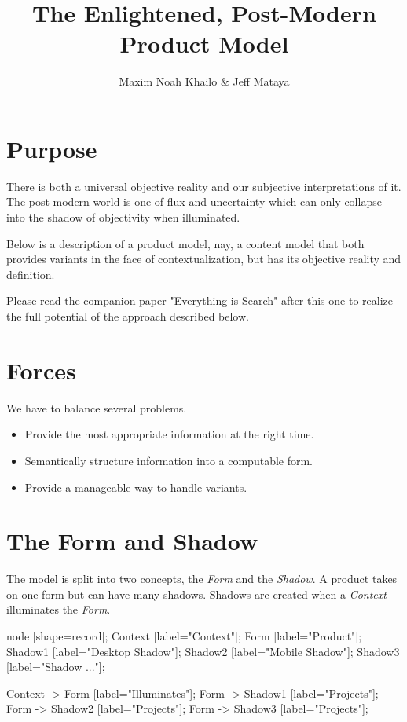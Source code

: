 \documentclass[11pt]{article}
\title{The Enlightened, Post-Modern Product Model}
\author{Maxim Noah Khailo \& Jeff Mataya}
\begin{document}
\maketitle
\section{Purpose}

There is both a universal objective reality and our subjective interpretations of 
it. The post-modern world is one of flux and uncertainty which can only collapse
into the shadow of objectivity when illuminated. 

Below is a description of a product model, nay, a content model that both provides
variants in the face of contextualization, but has its objective reality and definition.

Please read the companion paper "Everything is Search" after this one to realize
the full potential of the approach described below.

\section{Forces}

We have to balance several problems.

\begin{itemize}
    \item Provide the most appropriate information at the right time.
    \item Semantically structure information into a computable form.
    \item Provide a manageable way to handle variants.
\end{itemize}

\newpage
\section{The Form and Shadow}

The model is split into two concepts, the \emph{Form} and the \emph{Shadow}. 
A product takes on one form but can have many shadows. Shadows are created when
a \emph{Context} illuminates the \emph{Form}.

 {
    node [shape=record];
    Context [label="Context"];
    Form [label="Product"];
    Shadow1 [label="Desktop Shadow"];
    Shadow2 [label="Mobile Shadow"];
    Shadow3 [label="Shadow ..."];

    Context -> Form [label="Illuminates"];
    Form -> Shadow1 [label="Projects"];
    Form -> Shadow2 [label="Projects"];
    Form -> Shadow3 [label="Projects"];
}
\end{document}
